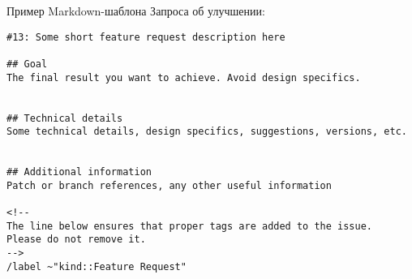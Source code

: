 
\pagebreak
\begin{center}
\end{center}

Пример Markdown-шаблона Запроса об улучшении:

\begin{lstlisting}[label={lst:featurerequest}]
#13: Some short feature request description here

## Goal
The final result you want to achieve. Avoid design specifics.


## Technical details
Some technical details, design specifics, suggestions, versions, etc.


## Additional information
Patch or branch references, any other useful information

<!--
The line below ensures that proper tags are added to the issue.
Please do not remove it.
-->
/label ~"kind::Feature Request"

\end{lstlisting}